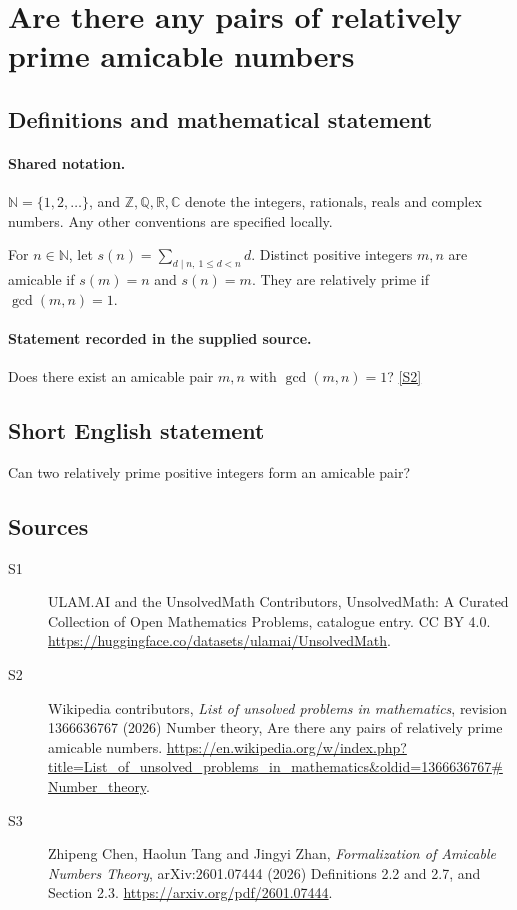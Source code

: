 \documentclass[11pt]{article}
\newcommand{\sref}[2]{\hyperlink{source:#1:#2}{[S#2]}}
\begin{document}
\section{Are there any pairs of relatively prime amicable numbers}\label{statement}

\subsection{Definitions and mathematical statement}

\paragraph{Shared notation.}$\mathbb N=\{1,2,\ldots\}$, and $\mathbb Z,\mathbb Q,\mathbb R,\mathbb C$ denote the integers, rationals, reals and complex numbers. Any other conventions are specified locally.


For $n\in\mathbb N$, let $s(n)=\sum_{d\mid n,\ 1\le d<n}d$. Distinct positive integers $m,n$ are amicable if $s(m)=n$ and $s(n)=m$. They are relatively prime if $\gcd(m,n)=1$.
\paragraph{Statement recorded in the supplied source.}
Does there exist an amicable pair $m,n$ with $\gcd(m,n)=1$? \sref{statement}{2}
\subsection{Short English statement}
Can two relatively prime positive integers form an amicable pair?
\subsection{Sources}
\begin{description}
\item[\hypertarget{source:statement:1}{S1}] ULAM.AI and the UnsolvedMath Contributors, UnsolvedMath: A Curated Collection of Open Mathematics Problems, catalogue entry. CC BY 4.0. \url{https://huggingface.co/datasets/ulamai/UnsolvedMath}.
\item[\hypertarget{source:statement:2}{S2}] Wikipedia contributors, \emph{List of unsolved problems in mathematics}, revision 1366636767 (2026) Number theory, Are there any pairs of relatively prime amicable numbers. \url{https://en.wikipedia.org/w/index.php?title=List_of_unsolved_problems_in_mathematics&oldid=1366636767#Number_theory}.
\item[\hypertarget{source:statement:3}{S3}] Zhipeng Chen, Haolun Tang and Jingyi Zhan, \emph{Formalization of Amicable Numbers Theory}, arXiv:2601.07444 (2026) Definitions 2.2 and 2.7, and Section 2.3. \url{https://arxiv.org/pdf/2601.07444}.
\end{description}
\label{end:statement}
\end{document}

